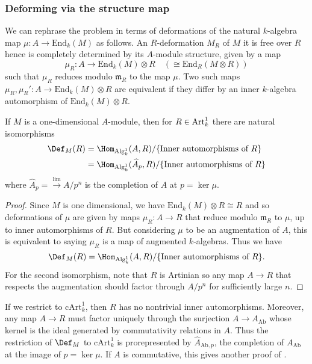 \subsubsection{Deforming via the structure map} We can rephrase the problem in
terms of deformations of the natural \(k\)-algebra map  \(\mu: A\rightarrow
\text{End}_k(M)\) as follows. An \(R\)-deformation \(M_R\) of \(M\) it is free
over \(R\) hence is completely determined by its \(A\)-module structure, given
by a map
\[
    \mu_R: A\rightarrow \text{End}_{k}(M)\otimes R\quad(\cong \text{End}_R(M\otimes R))
\]
such that \(\mu_R\) reduces modulo \(\mathfrak{m}_R\) to the map \(\mu\). Two
such maps \(\mu_R,\mu_R':A\rightarrow \text{End}_k(M)\otimes R\) are equivalent
if they differ by an inner \(k\)-algebra automorphism of
\(\text{End}_k(M)\otimes R\). 

\begin{proposition}\label{lemma-prorep-by-completion}
    If \(M\) is a one-dimensional \(A\)-module, then for \(R\in \textnormal{Art}^1_k\)
    there are natural isomorphisms
    \begin{align*} 
        \Def_M(R) &= \Hom_{\textnormal{Alg}^1_k}(A,R)/\{\text{Inner automorphisms of
        \(R\)}\}\\ 
                  &= \Hom_{\textnormal{Alg}^1_k}(\widehat{A}_p,R)/\{\text{Inner
                  automorphisms of \(R\)}\}
    \end{align*} 
    where \(\widehat{A}_p=\overset{\lim}{\rightarrow} A/p^n\) is the completion of
    \(A\) at \(p=\ker \mu\).     
    \begin{proof} 
        Since \(M\) is one dimensional, we have \(\text{End}_k(M)\otimes R \cong
        R\) and so deformations of \(\mu\) are given by maps
        \(\mu_R:A\rightarrow R\) that reduce modulo \(\mathfrak{m}_R\) to
        \(\mu\), up to inner automorphisms of \(R\). But considering \(\mu\) to
        be an augmentation of \(A\), this is equivalent to saying \(\mu_R\) is a
        map of augmented \(k\)-algebras. Thus we have \[\Def_M(R) =
        \Hom_{\textnormal{Alg}^1_k}(A,R)/\{\text{Inner automorphisms of
    \(R\)}\}.\] For the second isomorphism, note that \(R\) is Artinian so any
    map \(A\rightarrow R\) that respects the augmentation should factor through
    \(A/p^n\) for sufficiently large \(n\).
    \end{proof}
\end{proposition}

\begin{remark}
    If we restrict to \(\text{cArt}^1_k\), then \(R\) has no nontrivial inner
    automorphisms. Moreover, any map \(A\rightarrow R\) must factor uniquely
    through the surjection \(A\rightarrow A_\text{Ab}\) whose kernel is the
    ideal generated by commutativity relations in \(A\). Thus the restriction of
    \(\Def_M\) to \(\text{cArt}^1_k\) is prorepresented by
    \(\widehat{A}_{\text{Ab},p}\), the completion of \(A_\text{Ab}\) at the
    image of \(p=\ker\mu\). If \(A\) is commutative, this gives another proof of
    . 
\end{remark}

